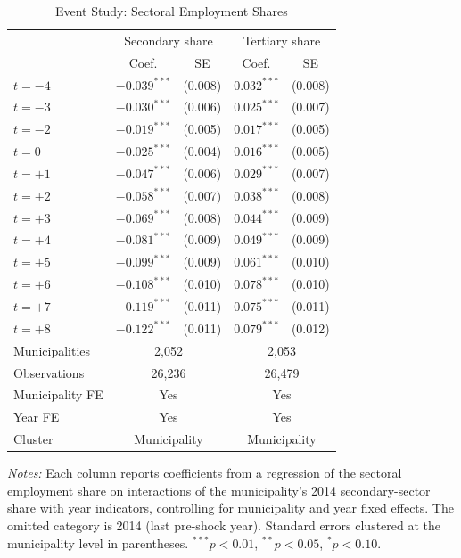\begin{table}[htbp]
\centering
\caption{Event Study: Sectoral Employment Shares}
\label{tab:event_study}
\begin{threeparttable}
\begin{tabular}{lcccc}
\hline\hline
 & \multicolumn{2}{c}{Secondary share} & \multicolumn{2}{c}{Tertiary share} \\
 & Coef. & SE & Coef. & SE \\
\hline
$t = -4$ & $-0.039^{***}$ & (0.008) & $0.032^{***}$ & (0.008) \\
$t = -3$ & $-0.030^{***}$ & (0.006) & $0.025^{***}$ & (0.007) \\
$t = -2$ & $-0.019^{***}$ & (0.005) & $0.017^{***}$ & (0.005) \\
$t = 0$ & $-0.025^{***}$ & (0.004) & $0.016^{***}$ & (0.005) \\
$t = +1$ & $-0.047^{***}$ & (0.006) & $0.029^{***}$ & (0.007) \\
$t = +2$ & $-0.058^{***}$ & (0.007) & $0.038^{***}$ & (0.008) \\
$t = +3$ & $-0.069^{***}$ & (0.008) & $0.044^{***}$ & (0.009) \\
$t = +4$ & $-0.081^{***}$ & (0.009) & $0.049^{***}$ & (0.009) \\
$t = +5$ & $-0.099^{***}$ & (0.009) & $0.061^{***}$ & (0.010) \\
$t = +6$ & $-0.108^{***}$ & (0.010) & $0.078^{***}$ & (0.010) \\
$t = +7$ & $-0.119^{***}$ & (0.011) & $0.075^{***}$ & (0.011) \\
$t = +8$ & $-0.122^{***}$ & (0.011) & $0.079^{***}$ & (0.012) \\[3pt]
\hline
Municipalities & \multicolumn{2}{c}{2,052} & \multicolumn{2}{c}{2,053} \\
Observations & \multicolumn{2}{c}{26,236} & \multicolumn{2}{c}{26,479} \\
Municipality FE & \multicolumn{2}{c}{Yes} & \multicolumn{2}{c}{Yes} \\
Year FE & \multicolumn{2}{c}{Yes} & \multicolumn{2}{c}{Yes} \\
Cluster & \multicolumn{2}{c}{Municipality} & \multicolumn{2}{c}{Municipality} \\
\hline\hline
\end{tabular}
\begin{tablenotes}[flushleft]\small
\item \textit{Notes:} Each column reports coefficients from a regression of the sectoral employment share on interactions of the municipality's 2014 secondary-sector share with year indicators, controlling for municipality and year fixed effects. The omitted category is 2014 (last pre-shock year). Standard errors clustered at the municipality level in parentheses. $^{***}p<0.01$, $^{**}p<0.05$, $^{*}p<0.10$.
\end{tablenotes}
\end{threeparttable}
\end{table}
